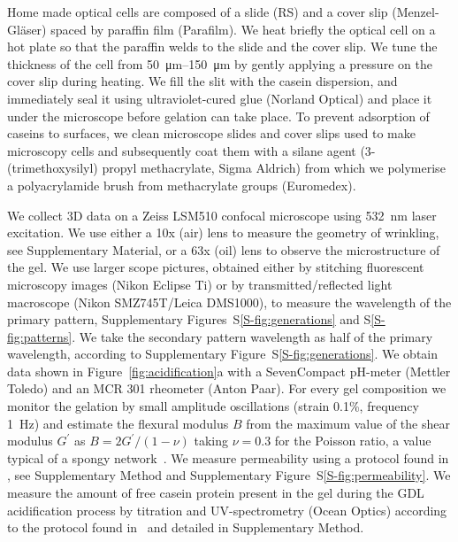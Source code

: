 \documentclass[twocolumn,superscriptaddress,showpacs,preprintnumbers, amsmath,amssymb,prl]{revtex4-1}
\begin{document}
Home made optical cells are composed of a slide (RS) and a cover slip (Menzel-Gl\"aser) spaced by paraffin film (Parafilm). We heat briefly the optical cell on a hot plate so that the paraffin welds to the slide and the cover slip. We tune the thickness of the cell from \SIrange{50}{150}{\micro\metre} by gently applying a pressure on the cover slip during heating. We fill the slit with the casein dispersion, and immediately seal it using ultraviolet-cured glue (Norland Optical) and place it under the microscope before gelation can take place. To prevent adsorption of caseins to surfaces, we clean microscope slides and cover slips used to make microscopy cells and subsequently coat them with a silane agent (3-(trimethoxysilyl) propyl methacrylate, Sigma Aldrich) from which we polymerise a polyacrylamide brush from methacrylate groups (Euromedex).

We collect 3D data on a Zeiss LSM510 confocal microscope using \SI{532}{\nano\meter} laser excitation. We use either a 10x (air) lens to measure the geometry of wrinkling, see Supplementary Material, or a 63x (oil) lens to observe the microstructure of the gel. We use larger scope pictures, obtained either by stitching fluorescent microscopy images (Nikon Eclipse Ti) or by transmitted/reflected light macroscope (Nikon SMZ745T/Leica DMS1000), to measure the wavelength of the primary pattern, Supplementary Figures~S\ref{S-fig:generations} and S\ref{S-fig:patterns}. We take the secondary pattern wavelength as half of the primary wavelength, according to Supplementary Figure~S\ref{S-fig:generations}.
We obtain data shown in Figure~\ref{fig:acidification}a with a SevenCompact pH-meter (Mettler Toledo) and an MCR 301 rheometer (Anton Paar). For every gel composition we monitor the gelation by small amplitude oscillations (strain 0.1\%, frequency \SI{1}{\hertz}) and estimate the flexural modulus $B$ from the maximum value of the shear modulus $G^\prime$ as $B=2G^\prime/(1-\nu)$ taking $\nu=0.3$ for the Poisson ratio, a value typical of a spongy network~\cite{Greaves2011}.
We measure permeability using a protocol found in \cite{VanDijk1986}, see Supplementary Method and Supplementary Figure~S\ref{S-fig:permeability}. We measure the amount of free casein protein present in the gel during the GDL acidification process by titration and UV-spectrometry (Ocean Optics) according to the protocol found in~\cite{Roefs1986} and detailed in Supplementary Method.



\end{document}
